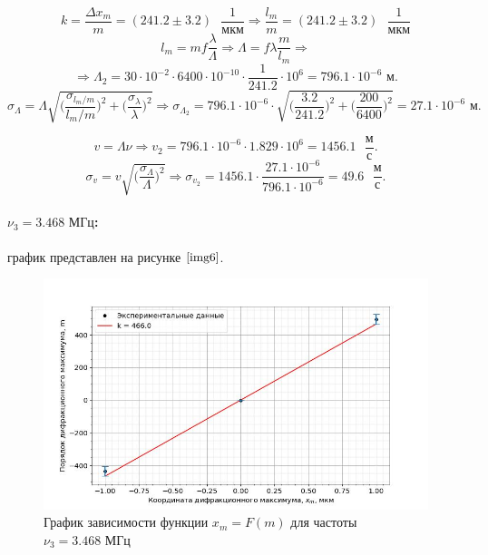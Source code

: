 \documentclass[a4paper,12pt]{article} %
\begin{document}
\[ k = \frac{\Delta x_{m}}{m} = (241.2\pm3.2)\text{ }\frac{1}{\text{мкм}} \Rightarrow \frac{l_{m}}{m} = (241.2\pm3.2)\text{ }\frac{1}{\text{мкм}} \]
\[ l_{m}=mf\frac{\lambda}{\Lambda} \Rightarrow \Lambda = f\lambda\frac{m}{l_{m}} \Rightarrow  \]
\[ \Rightarrow \Lambda_2 = 30\cdot10^{-2}\cdot6400\cdot10^{-10}\cdot\frac{1}{241.2}\cdot10^{6}=796.1\cdot10^{-6}\text{ м}. \]
\[ \sigma_{\Lambda} = \Lambda\sqrt{\Big(\frac{\sigma_{l_{m}/m}}{l_{m}/m}\Big)^2+ \Big(\frac{\sigma_{\lambda}}{\lambda}\Big)^2} \Rightarrow \sigma_{\Lambda_2} = 796.1\cdot10^{-6}\cdot\sqrt{\Big(\frac{3.2}{241.2}\Big)^2+\Big(\frac{200}{6400}\Big)^2} = 27.1\cdot10^{-6}\text{ м}. \]

\centering{}

\[ v=\Lambda\nu \Rightarrow v_2=796.1\cdot10^{-6}\cdot1.829\cdot10^{6}=1456.1\text{ }\frac{\text{м}}{\text{с}}. \]
\[ \sigma_{v} = v\sqrt{\Big(\frac{\sigma_{\Lambda}}{\Lambda}\Big)^2} \Rightarrow \sigma_{v_2} = 1456.1\cdot\frac{27.1\cdot10^{-6}}{796.1\cdot10^{-6}} = 49.6\text{ }\frac{\text{м}}{\text{с}}. \]

\centering{}

\newpage

\raggedright\paragraph{$\nu_3=3.468\text{ МГц}$:} график представлен на рисунке $\ref{img6}$.

\begin{figure}[h]
    \begin{center}
        \includegraphics[width=16cm]{image3.jpg}
    \end{center}
    \caption{График зависимости функции $x_m=F(m)$ для частоты $\nu_3=3.468\text{ МГц}$}
    \label{img6}
\end{figure}
\end{document}
